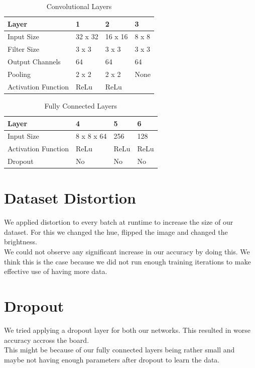 \documentclass[twoside, twocolumn]{article}
\begin{document}
\begin{table}[htb]
\label{table_conv}
	\caption{Convolutional Layers}
	\centering
		\begin{tabular}{l l l l}
			Layer & 1 & 2 & 3\\
			\midrule
			Input Size & 32 x 32 & 16 x 16  & 8 x 8\\
			Filter Size & 3 x 3 & 3 x 3 & 3 x 3\\
			Output Channels & 64 & 64 & 64\\
			Pooling & 2 x 2 & 2 x 2 & None\\
			Activation Function & ReLu & ReLu \\
\end{tabular}
\end{table}

\begin{table}[htb]
\label{table_fcl}
	\caption{Fully Connected Layers}
	\centering
		\begin{tabular}{l l l l}
			Layer & 4 & 5 & 6\\
			\midrule
			Input Size & 8 x 8 x 64 & 256 & 128 \\
			Activation Function & ReLu & ReLu & ReLu \\
			Dropout & No & No & No\\
\end{tabular}
\end{table}


\section{Dataset Distortion}

We applied distortion to every batch at runtime to increase the size of our dataset. For this we changed the hue, flipped the image and changed the brightness. \\
We could not observe any significant increase in our accuracy by doing this.
We think this is the case because we did not run enough training iterations to make effective use of having more data.


\section{Dropout}

We tried applying a dropout layer for both our networks. This resulted in worse accuracy accross the board. \\
This might be because of our fully connected layers being rather small and maybe not having enough parameters after dropout to learn the data.
\end{document}
